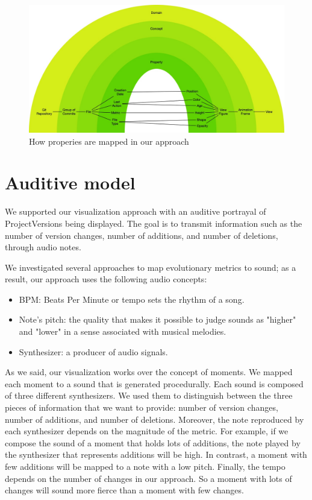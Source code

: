 \begin{figure}
    \center
    \includegraphics[width=\textwidth]{ApproachMapping.jpg}
    \caption{How properies are mapped in our approach}
    \label{fig:ApproachMapping}
\end{figure}



\section{Auditive model}

We supported our visualization approach with an auditive portrayal of ProjectVersions being displayed. The goal is to transmit information such as the number of version changes, number of additions, and number of deletions, through audio notes. 

We investigated several approaches to map evolutionary metrics to sound; as a result, our approach uses the following audio concepts:
\begin{itemize}
	\item BPM: Beats Per Minute or tempo sets the rhythm of a song. 
	\item Note's pitch: the quality that makes it possible to judge sounds as "higher" and "lower" in a sense associated with musical melodies.
	\item Synthesizer: a producer of audio signals. 
\end{itemize}

As we said, our visualization works over the concept of moments. We mapped each moment to a sound that is generated procedurally. 
Each sound is composed of three different synthesizers. We used them to distinguish between the three pieces of information that we want to provide: number of version changes, number of additions, and number of deletions. Moreover, the note reproduced by each synthesizer depends on the magnitude of the metric. For example, if we compose the sound of a moment that holds lots of additions, the note played by the synthesizer that represents additions will be high. In contrast, a moment with few additions will be mapped to a note with a low pitch. Finally, the tempo depends on the number of changes in our approach. So a moment with lots of changes will sound more fierce than a moment with few changes. 














